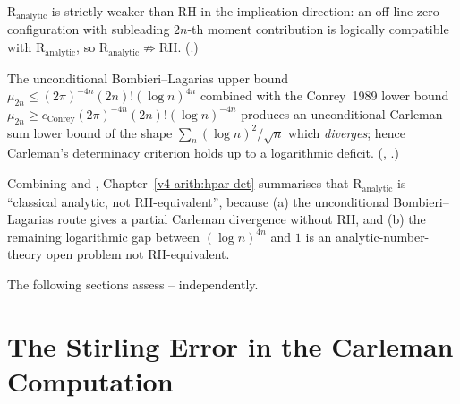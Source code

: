 \begin{claimnaive}
\label{v4-arith:r-audit:claim-2}
\(\mathrm{R}_{\mathrm{analytic}}\) is strictly weaker than RH in the
implication direction: an off-line-zero configuration with subleading
\(2n\)-th moment contribution is logically compatible with
\(\mathrm{R}_{\mathrm{analytic}}\), so
\(\mathrm{R}_{\mathrm{analytic}}\not\Rightarrow\mathrm{RH}\).
(.)
\end{claimnaive}

\begin{claimnaive}
\label{v4-arith:r-audit:claim-3}
The unconditional Bombieri--Lagarias upper bound
\(\mu_{2n}\le (2\pi)^{-4n}(2n)!(\log n)^{4n}\) combined with the
Conrey~1989 lower bound
\(\mu_{2n}\ge c_{\mathrm{Conrey}}(2\pi)^{-4n}(2n)!(\log n)^{-4n}\)
produces an unconditional Carleman sum lower bound of the shape
\(\sum_{n}(\log n)^{2}/\sqrt{n}\) which \emph{diverges}; hence
Carleman's determinacy criterion holds up to a logarithmic deficit.
(,
.)
\end{claimnaive}

\begin{claimnaive}
\label{v4-arith:r-audit:claim-paraphrase}
Combining  and
, Chapter~\ref{v4-arith:hpar-det}
summarises that \(\mathrm{R}_{\mathrm{analytic}}\) is ``classical
analytic, not RH-equivalent'', because (a) the unconditional
Bombieri--Lagarias route gives a partial Carleman divergence without
RH, and (b) the remaining logarithmic gap between
\((\log n)^{4n}\) and \(1\) is an analytic-number-theory open
problem not RH-equivalent.
\end{claimnaive}

The following sections assess
--
independently.

\section{The Stirling Error in the Carleman Computation}
\label{v4-arith:r-audit:stirling-error}

